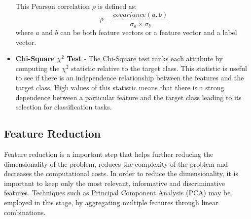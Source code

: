 \begin{itemize}
    This Pearson correlation $\rho$ is defined as:
    \[ \rho = \frac{covariance(a , b)}{\sigma _a\times \sigma _b} \]
    where $a$ and $b$ can be both feature vectors or a feature vector and a label vector.
    
    \item \textbf{Chi-Square $\chi^2$ Test} - The Chi-Square test ranks each attribute by computing the $\chi^2$ statistic relative to the target class. This statistic is useful to see if there is an independence relationship between the features and the target class. High values of this statistic means that there is a strong dependence between a particular feature and the target class leading to its selection for classification tasks.
\end{itemize}

\subsection{Feature Reduction}

Feature reduction is a important step that helps further reducing the dimensionality of the problem, reduces the complexity of the problem and decreases the computational costs. In order to reduce the dimensionality, it is important to keep only the most relevant, informative and discriminative features. Techniques such as Principal Component Analysis (PCA) may be employed in this stage, by aggregating multiple features through linear combinations.

